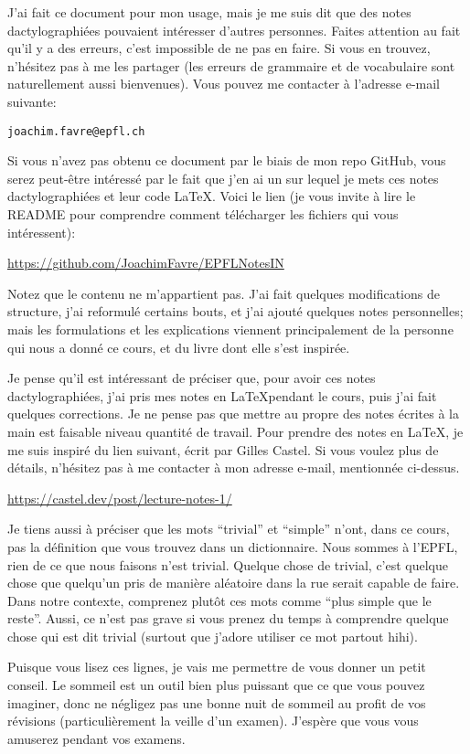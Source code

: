 J'ai fait ce document pour mon usage, mais je me suis dit que des notes dactylographiées pouvaient intéresser d'autres personnes. Faites attention au fait qu'il y a des erreurs, c'est impossible de ne pas en faire. Si vous en trouvez, n'hésitez pas à me les partager (les erreurs de grammaire et de vocabulaire sont naturellement aussi bienvenues). Vous pouvez me contacter à l'adresse e-mail suivante:
\begin{center}
    \texttt{joachim.favre@epfl.ch}
\end{center}

Si vous n'avez pas obtenu ce document par le biais de mon repo GitHub, vous serez peut-être intéressé par le fait que j'en ai un sur lequel je mets ces notes dactylographiées et leur code LaTeX. Voici le lien (je vous invite à lire le README pour comprendre comment télécharger les fichiers qui vous intéressent):
\begin{center}
    \url{https://github.com/JoachimFavre/EPFLNotesIN}
\end{center}

Notez que le contenu ne m'appartient pas. J'ai fait quelques modifications de structure, j'ai reformulé certains bouts, et j'ai ajouté quelques notes personnelles; mais les formulations et les explications viennent principalement de la personne qui nous a donné ce cours, et du livre dont elle s'est inspirée.

Je pense qu'il est intéressant de préciser que, pour avoir ces notes dactylographiées, j'ai pris mes notes en \LaTeX pendant le cours, puis j'ai fait quelques corrections. Je ne pense pas que mettre au propre des notes écrites à la main est faisable niveau quantité de travail. Pour prendre des notes en \LaTeX, je me suis inspiré du lien suivant, écrit par Gilles Castel. Si vous voulez plus de détails, n'hésitez pas à me contacter à mon adresse e-mail, mentionnée ci-dessus.
\begin{center}
    \url{https://castel.dev/post/lecture-notes-1/}
\end{center}

Je tiens aussi à préciser que les mots ``trivial'' et ``simple'' n'ont, dans ce cours, pas la définition que vous trouvez dans un dictionnaire. Nous sommes à l'EPFL, rien de ce que nous faisons n'est trivial. Quelque chose de trivial, c'est quelque chose que quelqu'un pris de manière aléatoire dans la rue serait capable de faire. Dans notre contexte, comprenez plutôt ces mots comme ``plus simple que le reste''. Aussi, ce n'est pas grave si vous prenez du temps à comprendre quelque chose qui est dit trivial (surtout que j'adore utiliser ce mot partout hihi).

Puisque vous lisez ces lignes, je vais me permettre de vous donner un petit conseil. Le sommeil est un outil bien plus puissant que ce que vous pouvez imaginer, donc ne négligez pas une bonne nuit de sommeil au profit de vos révisions (particulièrement la veille d'un examen). J'espère que vous vous amuserez pendant vos examens.
